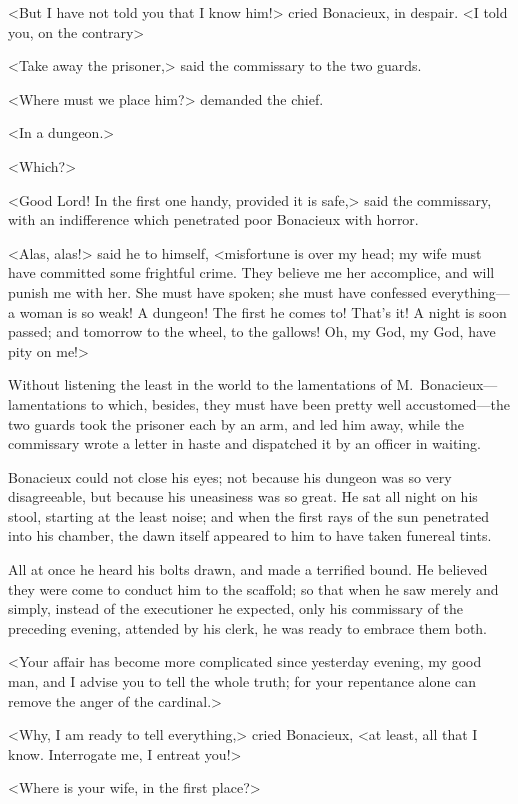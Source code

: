 <But I have not told you that I know him!> cried Bonacieux, in despair. <I told you, on the contrary\longdash> 

<Take away the prisoner,> said the commissary to the two guards. 

<Where must we place him?> demanded the chief. 

<In a dungeon.> 

<Which?> 

<Good Lord! In the first one handy, provided it is safe,> said the commissary, with an indifference which penetrated poor Bonacieux with horror. 

<Alas, alas!> said he to himself, <misfortune is over my head; my wife must have committed some frightful crime. They believe me her accomplice, and will punish me with her. She must have spoken; she must have confessed everything—a woman is so weak! A dungeon! The first he comes to! That's it! A night is soon passed; and tomorrow to the wheel, to the gallows! Oh, my God, my God, have pity on me!> 

Without listening the least in the world to the lamentations of M.~Bonacieux—lamentations to which, besides, they must have been pretty well accustomed—the two guards took the prisoner each by an arm, and led him away, while the commissary wrote a letter in haste and dispatched it by an officer in waiting. 

Bonacieux could not close his eyes; not because his dungeon was so very disagreeable, but because his uneasiness was so great. He sat all night on his stool, starting at the least noise; and when the first rays of the sun penetrated into his chamber, the dawn itself appeared to him to have taken funereal tints. 

All at once he heard his bolts drawn, and made a terrified bound. He believed they were come to conduct him to the scaffold; so that when he saw merely and simply, instead of the executioner he expected, only his commissary of the preceding evening, attended by his clerk, he was ready to embrace them both. 

<Your affair has become more complicated since yesterday evening, my good man, and I advise you to tell the whole truth; for your repentance alone can remove the anger of the cardinal.> 

<Why, I am ready to tell everything,> cried Bonacieux, <at least, all that I know. Interrogate me, I entreat you!> 

<Where is your wife, in the first place?> 

